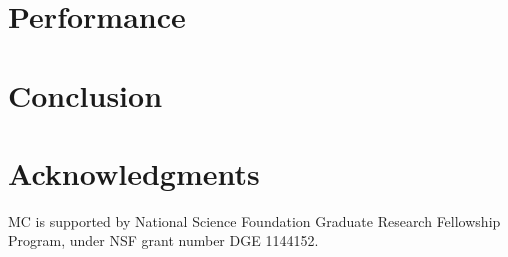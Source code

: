 \documentclass[twocolumn]{aastex61}
\begin{document}
\section{Performance}
\label{sec:performance}

\section{Conclusion}
\label{sec:conclusions}

\section{Acknowledgments}
MC is supported by National Science Foundation Graduate Research Fellowship Program, under NSF grant number DGE 1144152.



\end{document}
